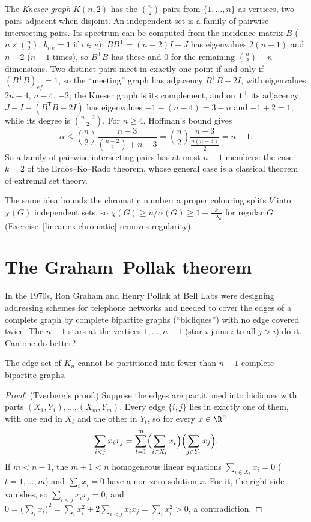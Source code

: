 \begin{example}\label{linear:exa:ekr}
The \emph{Kneser graph} $K(n,2)$ has the $\binom n2$ pairs from $\{1,\dots,n\}$ as vertices, two pairs adjacent when disjoint. An
independent set is a family of pairwise intersecting pairs. Its spectrum can be computed from the incidence matrix $B$ ($n\times
\binom n2$, $b_{i,e}=1$ if $i\in e$): $BB^{\mathsf T}=(n-2)I+J$ has eigenvalues $2(n-1)$ and $n-2$ ($n-1$ times), so $B^{\mathsf T}B$
has these and $0$ for the remaining $\binom n2-n$ dimensions. Two distinct pairs meet in exactly one point if and only if
$(B^{\mathsf T}B)_{ef}=1$, so the ``meeting'' graph has adjacency $B^{\mathsf T}B-2I$, with eigenvalues $2n-4$, $n-4$, $-2$; the
Kneser graph is its complement, and on $\mathbf 1^\perp$ its adjacency $J-I-(B^{\mathsf T}B-2I)$ has eigenvalues $-1-(n-4)=3-n$ and
$-1+2=1$, while its degree is $\binom{n-2}2$. For $n\ge4$, Hoffman's bound gives
\[
\alpha\le\binom n2\frac{n-3}{\binom{n-2}2+n-3}=\binom n2\frac{n-3}{\frac{n(n-3)}2}=n-1.
\]
So a family of pairwise intersecting pairs has at most $n-1$ members: the case $k=2$ of the Erd\H{o}s--Ko--Rado theorem, whose
general case is a classical theorem of extremal set theory.
\end{example}

The same idea bounds the chromatic number: a proper colouring splits $V$ into $\chi(G)$ independent sets, so
$\chi(G)\ge n/\alpha(G)\ge1+\frac k{-\lambda_n}$ for regular $G$ (Exercise~\ref{linear:ex:chromatic} removes regularity).

\section{The Graham--Pollak theorem}

In the 1970s, Ron Graham and Henry Pollak at Bell Labs were designing addressing schemes for telephone networks and needed to
cover the edges of a complete graph by complete bipartite graphs (``bicliques'') with no edge covered twice. The $n-1$ stars at
the vertices $1,\dots,n-1$ (star $i$ joins $i$ to all $j>i$) do it. Can one do better?

\begin{theorem}\label{linear:thm:grahampollak}
The edge set of $K_n$ cannot be partitioned into fewer than $n-1$ complete bipartite graphs.
\end{theorem}
\begin{proof}
(Tverberg's proof.) Suppose the edges are partitioned into bicliques with parts $(X_1,Y_1),\dots,(X_m,Y_m)$. Every edge $\{i,j\}$
lies in exactly one of them, with one end in $X_t$ and the other in $Y_t$, so for every $x\in\R^n$
\[
\sum_{i<j}x_ix_j=\sum_{t=1}^m\Bigl(\sum_{i\in X_t}x_i\Bigr)\Bigl(\sum_{j\in Y_t}x_j\Bigr).
\]
If $m<n-1$, the $m+1<n$ homogeneous linear equations $\sum_{i\in X_t}x_i=0$ ($t=1,\dots,m$) and $\sum_ix_i=0$ have a non-zero solution
$x$. For it, the right side vanishes, so $\sum_{i<j}x_ix_j=0$, and $0=\bigl(\sum_ix_i\bigr)^2=\sum_ix_i^2+2\sum_{i<j}x_ix_j=\sum_i
x_i^2>0$, a contradiction.
\end{proof}

